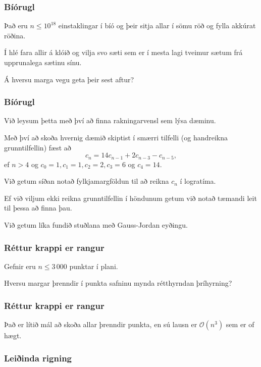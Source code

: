 {
	\frametitle{Bíórugl}
	{
		\item<1-> Það eru $n \leq 10^{18}$ einstaklingar í bíó og þeir sitja allar í sömu röð og fylla akkúrat röðina.
		\item<2-> Í hlé fara allir á klóið og vilja svo sæti sem er í mesta lagi tveimur sætum frá upprunalega sætinu sínu.
		\item<3-> Á hversu marga vegu geta þeir sest aftur?
	}
}

{
	\frametitle{Bíórugl}
	{
		\item<1-> Við leysum þetta með því að finna rakningarvensl sem lýsa dæminu.
		\item<2-> Með því að skoða hvernig dæmið skiptist í smærri tilfelli (og handreikna grunntilfellin) fæst að
		\[
			c_n = 14c_{n - 1} + 2c_{n - 3} - c_{n - 5},
		\]
		ef $n > 4$ og $c_0 = 1, c_1 = 1, c_2 = 2, c_3 = 6$ og $c_4 = 14$.
		\item<3-> Við getum síðan notað fylkjamargföldun til að reikna $c_n$ í logratíma.
		\item<4-> Ef við viljum ekki reikna grunntilfellin í höndunum getum við notað tæmandi leit til þessa að finna þau.
		\item<5-> Við getum líka fundið stuðlana með Gauss-Jordan eyðingu.
	}
}

{
	\frametitle{Réttur krappi er rangur}
	{
		\item<1-> Gefnir eru $n \leq 3\, 000$ punktar í plani.
		\item<2-> Hversu margar þrenndir í punkta safninu mynda rétthyrndan þríhyrning?
	}
}

{
	\frametitle{Réttur krappi er rangur}
	{
		\item<1-> Það er lítið mál að skoða allar þrenndir punkta, en sú lausn er $\mathcal{O}(n^3)$ sem er of hægt.
		\item<2-> 

	}
}

{
	\frametitle{Leiðinda rigning}
	{
		\item<1-> 
	}
}

{
}


